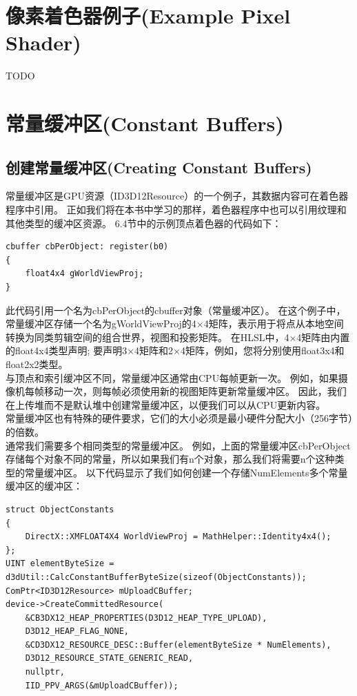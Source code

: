 \documentclass[11pt,a4paper,oldfontcommands]{memoir}
\begin{document}
{\section{像素着色器例子(Example Pixel Shader)}
TODO
\section{常量缓冲区(Constant Buffers)}
\subsection{创建常量缓冲区(Creating Constant Buffers)}
\begin{flushleft}
常量缓冲区是GPU资源（ID3D12Resource）的一个例子，其数据内容可在着色器程序中引用。 正如我们将在本书中学习的那样，着色器程序中也可以引用纹理和其他类型的缓冲区资源。 6.4节中的示例顶点着色器的代码如下：
\begin{lstlisting}
cbuffer cbPerObject: register(b0)
{
    float4x4 gWorldViewProj;
}
\end{lstlisting}
此代码引用一个名为cbPerObject的cbuffer对象（常量缓冲区）。 在这个例子中，常量缓冲区存储一个名为gWorldViewProj的4×4矩阵，表示用于将点从本地空间转换为同类剪辑空间的组合世界，视图和投影矩阵。 在HLSL中，4×4矩阵由内置的float4x4类型声明; 要声明3×4矩阵和2×4矩阵，例如，您将分别使用float3x4和float2x2类型。\\
与顶点和索引缓冲区不同，常量缓冲区通常由CPU每帧更新一次。 例如，如果摄像机每帧移动一次，则每帧必须使用新的视图矩阵更新常量缓冲区。 因此，我们在上传堆而不是默认堆中创建常量缓冲区，以便我们可以从CPU更新内容。\\
常量缓冲区也有特殊的硬件要求，它们的大小必须是最小硬件分配大小（256字节）的倍数。\\
通常我们需要多个相同类型的常量缓冲区。 例如，上面的常量缓冲区cbPerObject存储每个对象不同的常量，所以如果我们有n个对象，那么我们将需要n个这种类型的常量缓冲区。 以下代码显示了我们如何创建一个存储NumElements多个常量缓冲区的缓冲区：
\begin{lstlisting}
struct ObjectConstants
{
    DirectX::XMFLOAT4X4 WorldViewProj = MathHelper::Identity4x4();
};
UINT elementByteSize = d3dUtil::CalcConstantBufferByteSize(sizeof(ObjectConstants));
ComPtr<ID3D12Resource> mUploadCBuffer;
device->CreateCommittedResource(
    &CB3DX12_HEAP_PROPERTIES(D3D12_HEAP_TYPE_UPLOAD), 
    D3D12_HEAP_FLAG_NONE, 
    &CD3DX12_RESOURCE_DESC::Buffer(elementByteSize * NumElements),
    D3D12_RESOURCE_STATE_GENERIC_READ,
    nullptr, 
    IID_PPV_ARGS(&mUploadCBuffer));
\end{lstlisting}

\end{flushleft}}
\end{document}
